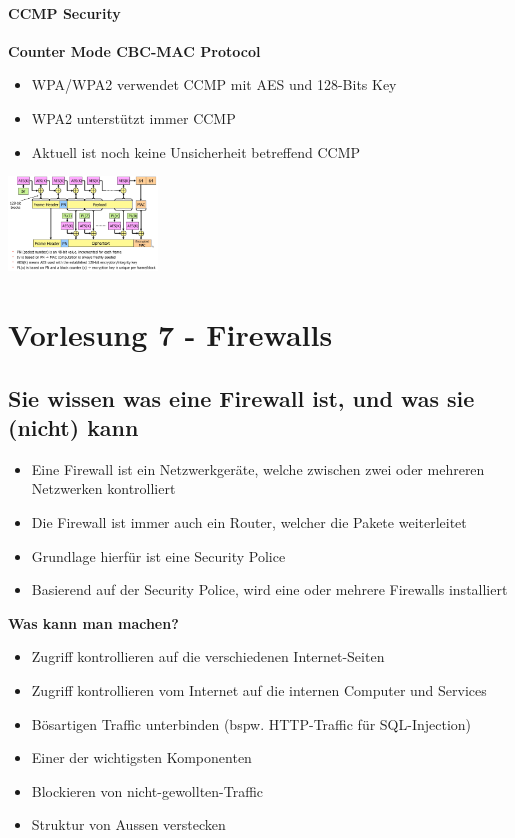 \documentclass{report}
\newenvironment{Figure}
	{\par\medskip\noindent\minipage{\linewidth}}
	{\endminipage\par\medskip}
\theoremstyle{definition}
\theoremstyle{example}
\begin{document}
		\subsubsection{CCMP Security}
\textbf{Counter Mode CBC-MAC Protocol}
\begin{itemize}
	\item WPA/WPA2 verwendet CCMP mit AES und 128-Bits Key
	\item WPA2 unterstützt immer CCMP
	\item Aktuell ist noch keine Unsicherheit betreffend CCMP
\end{itemize}

\begin{Figure}
\centering
\includegraphics[width=150px]{img/CCMPSecurity.png}
	\label{fig:Ablauf von CCMP}
\end{Figure}


\chapter{Vorlesung 7 - Firewalls}

\section{Sie wissen was eine Firewall ist, und was sie (nicht) kann}
\begin{itemize}
	\item Eine Firewall ist ein Netzwerkgeräte, welche zwischen zwei oder mehreren Netzwerken kontrolliert
	\item Die Firewall ist immer auch ein Router, welcher die Pakete weiterleitet
	\item Grundlage hierfür ist eine Security Police
	\item Basierend auf der Security Police, wird eine oder mehrere Firewalls installiert	
\end{itemize} 

\textbf{Was kann man machen?}
\begin{itemize}
	\item Zugriff kontrollieren auf die verschiedenen Internet-Seiten
	\item Zugriff kontrollieren vom Internet auf die internen Computer und Services
	\item Bösartigen Traffic unterbinden (bspw. HTTP-Traffic für SQL-Injection)
	\item Einer der wichtigsten Komponenten
	\item Blockieren von nicht-gewollten-Traffic
	\item Struktur von Aussen verstecken
\end{itemize}
\end{document}
